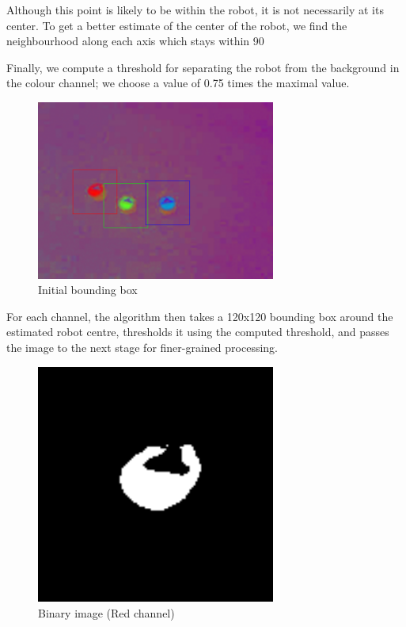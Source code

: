 \documentclass{article}
\begin{document}
Although this point is likely to be within the robot, it is not necessarily at its center. To get a better estimate of the center of the robot, we find the neighbourhood along each axis which stays within 90%

Finally, we compute a threshold for separating the robot from the background in the colour channel; we choose a value of 0.75 times the maximal value.

\begin{figure}[htbp!]
  \centering
    \includegraphics[width=0.7\textwidth]{../Drawings/pipeline-06-boundingboxes.png}
    \caption{Initial bounding box}
    \label{fig:firstbb}
\end{figure}

For each channel, the algorithm then takes a 120x120 bounding box around the estimated robot centre, thresholds it using the computed threshold, and passes the image to the next stage for finer-grained processing.

\begin{figure}[htbp!]
  \centering
    \includegraphics[width=0.7\textwidth]{../Drawings/pipeline-07-R-bin.png}
    \caption{Binary image (Red channel)}
    \label{fig:timg}
\end{figure}
\end{document}
